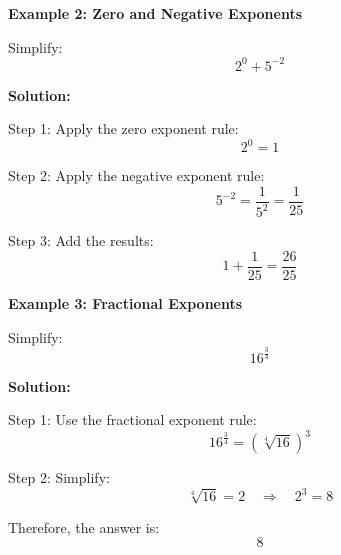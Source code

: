 \documentclass{article}
\begin{document}
\begin{flushleft}
\textbf{Example 2: Zero and Negative Exponents}

Simplify:  
\[
2^0 + 5^{-2}
\]

\textbf{Solution:} \vspace{0.2cm}

Step 1: Apply the zero exponent rule:  
\[
2^0 = 1
\]

Step 2: Apply the negative exponent rule:  
\[
5^{-2} = \frac{1}{5^2} = \frac{1}{25}
\]

Step 3: Add the results:  
\[
1 + \frac{1}{25} = \frac{26}{25}
\]
\end{flushleft}

\begin{flushleft}
\textbf{Example 3: Fractional Exponents}

Simplify:  
\[
16^{\frac{3}{4}}
\]

\textbf{Solution:} \vspace{0.2cm}

Step 1: Use the fractional exponent rule:  
\[
16^{\frac{3}{4}} = \left( \sqrt[4]{16} \right)^3
\]

Step 2: Simplify:  
\[
\sqrt[4]{16} = 2 \quad \Rightarrow \quad 2^3 = 8
\]

Therefore, the answer is:  
\[
8
\]
\end{flushleft}
\end{document}
